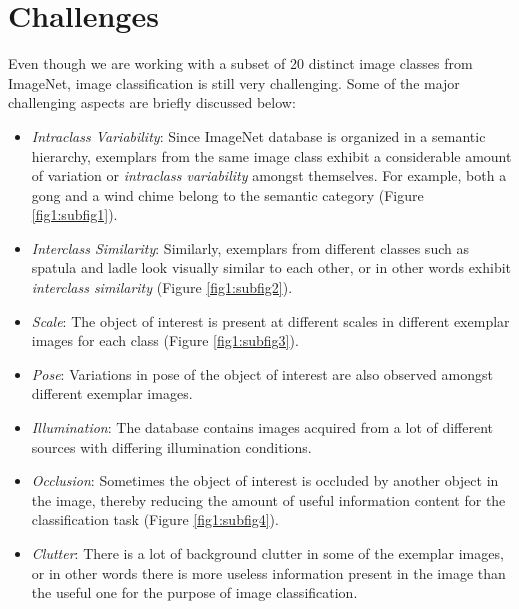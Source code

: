 \documentclass[12pt]{article}
\begin{document}
\section{Challenges}
Even though we are working with a subset of 20 distinct image classes from ImageNet, image classification is still very challenging. Some of the major challenging aspects are briefly discussed below:
\begin{itemize}
\item \textit{Intraclass Variability}: Since ImageNet database is organized in a semantic hierarchy, exemplars from the same image class exhibit a considerable amount of variation or \textit{intraclass variability} amongst themselves. For example, both a gong and a wind chime belong to the semantic category (Figure \ref{fig1:subfig1}).
\item \textit{Interclass Similarity}: Similarly, exemplars from different classes such as spatula and ladle look visually similar to each other, or in other words exhibit \textit{interclass similarity} (Figure \ref{fig1:subfig2}).
\item \textit{Scale}: The object of interest is present at different scales in different exemplar images for each class (Figure \ref{fig1:subfig3}).
\item \textit{Pose}: Variations in pose of the object of interest are also observed amongst different exemplar images.
\item \textit{Illumination}: The database contains images acquired from a lot of different sources with differing illumination conditions.
\item \textit{Occlusion}: Sometimes the object of interest is occluded by another object in the image, thereby reducing the amount of useful information content for the classification task (Figure \ref{fig1:subfig4}).
\item \textit{Clutter}: There is a lot of background clutter in some of the exemplar images, or in other words there is more useless information present in the image than the useful one for the purpose of image classification.
\end{itemize}
\end{document}
